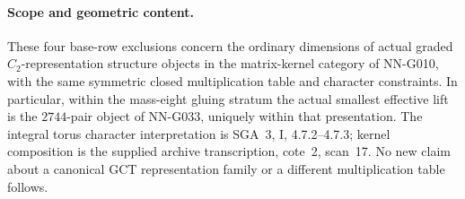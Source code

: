 \paragraph{Scope and geometric content.}
These four base-row exclusions concern the ordinary
dimensions of actual graded $C_2$-representation
structure objects in the matrix-kernel category of
NN-G010, with the same symmetric closed multiplication
table and character constraints. In particular, within
the mass-eight gluing stratum the actual smallest
effective lift is the $2744$-pair object of NN-G033,
uniquely within that presentation. The integral torus
character interpretation is SGA~3, I, 4.7.2--4.7.3;
kernel composition is the supplied archive transcription,
cote~2, scan~17. No new claim about a canonical GCT
representation family or a different multiplication
table follows.
